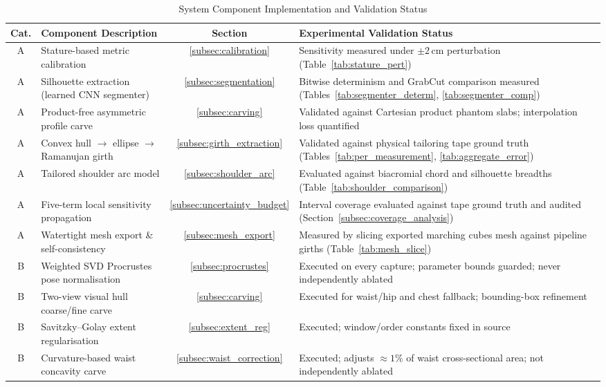 \documentclass[journal]{IEEEtran}
\begin{document}
\begin{table}[!t]
\caption{System Component Implementation and Validation Status}
\label{tab:implementation_status}
\centering
\begin{tabular}{c p{5.5cm} c p{7.5cm}}
\toprule
\textbf{Cat.} & \textbf{Component Description} & \textbf{Section} & \textbf{Experimental Validation Status} \\
\midrule
A & Stature-based metric calibration & \ref{subsec:calibration} & Sensitivity measured under $\pm 2$\,cm perturbation (Table~\ref{tab:stature_pert}) \\
A & Silhouette extraction (learned CNN segmenter) & \ref{subsec:segmentation} & Bitwise determinism and GrabCut comparison measured (Tables~\ref{tab:segmenter_determ}, \ref{tab:segmenter_comp}) \\
A & Product-free asymmetric profile carve & \ref{subsec:carving} & Validated against Cartesian product phantom slabs; interpolation loss quantified \\
A & Convex hull $\to$ ellipse $\to$ Ramanujan girth & \ref{subsec:girth_extraction} & Validated against physical tailoring tape ground truth (Tables~\ref{tab:per_measurement}, \ref{tab:aggregate_error}) \\
A & Tailored shoulder arc model & \ref{subsec:shoulder_arc} & Evaluated against biacromial chord and silhouette breadths (Table~\ref{tab:shoulder_comparison}) \\
A & Five-term local sensitivity propagation & \ref{subsec:uncertainty_budget} & Interval coverage evaluated against tape ground truth and audited (Section~\ref{subsec:coverage_analysis}) \\
A & Watertight mesh export \& self-consistency & \ref{subsec:mesh_export} & Measured by slicing exported marching cubes mesh against pipeline girths (Table~\ref{tab:mesh_slice}) \\
\midrule
B & Weighted SVD Procrustes pose normalisation & \ref{subsec:procrustes} & Executed on every capture; parameter bounds guarded; never independently ablated \\
B & Two-view visual hull coarse/fine carve & \ref{subsec:carving} & Executed for waist/hip and chest fallback; bounding-box refinement \\
B & Savitzky--Golay extent regularisation & \ref{subsec:extent_reg} & Executed; window/order constants fixed in source \\
B & Curvature-based waist concavity carve & \ref{subsec:waist_correction} & Executed; adjusts $\approx 1\%$ of waist cross-sectional area; not independently ablated \\

\end{tabular}
\end{table}
\end{document}
